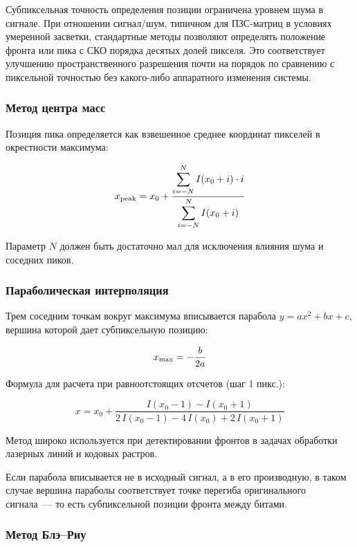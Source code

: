 Субпиксельная точность определения позиции ограничена уровнем шума в сигнале. При отношении сигнал/шум, типичном для ПЗС-матриц в условиях умеренной засветки, стандартные методы позволяют определять положение фронта или пика с СКО порядка десятых долей пикселя. Это соответствует улучшению пространственного разрешения почти на порядок по сравнению с пиксельной точностью без какого-либо аппаратного изменения системы.

\subsubsection{Метод центра масс \cite{blais_rioux_peak}}

Позиция пика определяется как взвешенное среднее координат пикселей в окрестности
максимума:

$$
x_{\rm peak} = x_0 + \frac{\displaystyle\sum_{i=-N}^{N} I(x_0 + i)\cdot i}
                           {\displaystyle\sum_{i=-N}^{N} I(x_0 + i)}
$$

Параметр $N$ должен быть достаточно мал для исключения влияния шума и соседних пиков.

\subsubsection{Параболическая интерполяция \cite{phase_matching_sampling} \cite{blais_rioux_peak}}

Трем соседним точкам вокруг максимума вписывается парабола $y = ax^2 + bx + c$, вершина которой дает субпиксельную позицию:

$$
x_{\rm max} = -\frac{b}{2a}
$$

Формула для расчета при равноотстоящих отсчетов (шаг 1 пикс.):

$$
x = x_0 + \frac{I(x_0 - 1) - I(x_0 + 1)}
               {2\,I(x_0 - 1) - 4\,I(x_0) + 2\,I(x_0 + 1)}
$$

Метод широко используется при детектировании фронтов в задачах обработки лазерных линий и кодовых растров.

Если парабола вписывается не в исходный сигнал, а в его производную, в таком случае вершина параболы соответствует точке перегиба оригинального сигнала~— то есть субпиксельной позиции фронта между битами.

\subsubsection{Метод Блэ–Риу \cite{blais_rioux_peak}}

